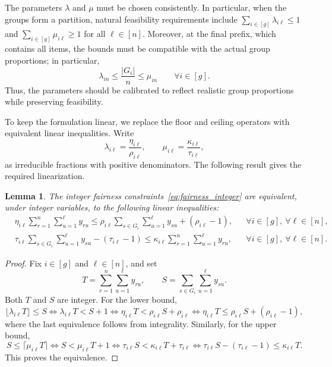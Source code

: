 \documentclass[pdflatex,basic,Numbered]{jnl}%
\theoremstyle{plain}
\newtheorem{lemma}{Lemma}
\theoremstyle{remark}
\theoremstyle{thmstyleone}%
\theoremstyle{thmstylethree}%
\begin{document}
The parameters \(\lambda\) and \(\mu\) must be chosen consistently. In particular, when the groups form a partition, natural feasibility requirements include \(\sum_{i\in[g]}\lambda_{i\ell}\le 1\) and \(\sum_{i\in[g]}\mu_{i\ell}\ge 1\) for all \(\ell\in[n]\). Moreover, at the final prefix, which contains all items, the bounds must be compatible with the actual group proportions; in particular,
\[
\lambda_{in}\le \frac{|G_i|}{n}\le \mu_{in}
\qquad \forall i\in[g].
\]
Thus, the parameters should be calibrated to reflect realistic group proportions while preserving feasibility.

To keep the formulation linear, we replace the floor and ceiling operators with equivalent linear inequalities. Write
\[
\lambda_{i\ell}=\frac{\eta_{i\ell}}{\rho_{i\ell}},
\qquad
\mu_{i\ell}=\frac{\kappa_{i\ell}}{\tau_{i\ell}},
\]
as irreducible fractions with positive denominators. The following result gives the required linearization.

\begin{lemma}\label{lem:linearization}
The integer fairness constraints~\eqref{eq:fairness_integer} are equivalent, under integer variables, to the following linear inequalities:
\begin{subequations}\label{eq:linearized_fairness}
\begin{align}
& \eta_{i\ell}\sum_{r=1}^n\sum_{u=1}^{\ell}y_{ru}
\le
\rho_{i\ell}\sum_{s\in G_i}\sum_{u=1}^{\ell}y_{su}
+(\rho_{i\ell}-1),
&& \forall i\in[g],\ \forall \ell\in[n],
\label{eq:linearized_fairness_lower}\\
& \tau_{i\ell}\sum_{s\in G_i}\sum_{u=1}^{\ell}y_{su}
-(\tau_{i\ell}-1)
\le
\kappa_{i\ell}\sum_{r=1}^n\sum_{u=1}^{\ell}y_{ru},
&& \forall i\in[g],\ \forall \ell\in[n].
\label{eq:linearized_fairness_upper}
\end{align}
\end{subequations}
\end{lemma}

\begin{proof}
Fix \(i\in[g]\) and \(\ell\in[n]\), and set
\[
T=\sum_{r=1}^n\sum_{u=1}^{\ell}y_{ru},
\qquad
S=\sum_{s\in G_i}\sum_{u=1}^{\ell}y_{su}.
\]
Both \(T\) and \(S\) are integer. For the lower bound,
\[
\lfloor \lambda_{i\ell}T\rfloor \le S
\Longleftrightarrow
\lambda_{i\ell}T<S+1
\Longleftrightarrow
\eta_{i\ell}T<\rho_{i\ell}S+\rho_{i\ell}
\Longleftrightarrow
\eta_{i\ell}T\le \rho_{i\ell}S+(\rho_{i\ell}-1),
\]
where the last equivalence follows from integrality. Similarly, for the upper bound,
\[
S\le \lceil \mu_{i\ell}T\rceil
\Longleftrightarrow
S<\mu_{i\ell}T+1
\Longleftrightarrow
\tau_{i\ell}S<\kappa_{i\ell}T+\tau_{i\ell}
\Longleftrightarrow
\tau_{i\ell}S-(\tau_{i\ell}-1)\le \kappa_{i\ell}T.
\]
This proves the equivalence.
\end{proof}
\end{document}
